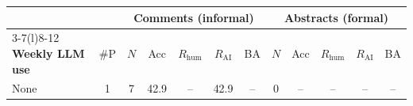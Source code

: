 \documentclass[thesis]{cluu}
\newcommand{\cg}[1]{\cellcolor{hmgreen!#1}}
\newcommand{\crd}[1]{\cellcolor{hmred!#1}}
\providecommand{\DIFaddbeginFL}{} %
\providecommand{\DIFaddendFL}{} %
\providecommand{\DIFdelbeginFL}{} %
\providecommand{\DIFdelendFL}{} %
\begin{document}
\begin{table}[H]
  \centering
  \small
  \DIFdelbeginFL %
\DIFdelendFL \DIFaddbeginFL \setlength{\tabcolsep}{3pt}
  \DIFaddendFL \renewcommand{\arraystretch}{1.15}
  \DIFdelbeginFL %
\DIFdelendFL \DIFaddbeginFL \begin{tabular}{l c c cccc c cccc}
    \toprule
    & & \multicolumn{5}{c}{\textbf{Comments} (informal)}
        & \multicolumn{5}{c}{\textbf{Abstracts} (formal)} \\
    \cmidrule(lr){3-7}\cmidrule(l){8-12}
    \textbf{Weekly LLM use} & \#P
     & $N$ & Acc & $R_{\mathrm{hum}}$ & $R_{\mathrm{AI}}$ & BA
     & $N$ & Acc & $R_{\mathrm{hum}}$ & $R_{\mathrm{AI}}$ & BA \\
    \midrule
None & 1 & 7 & 42.9 & -- & 42.9 & -- & 0 & -- & -- & -- & -- \\

\end{tabular}
\end{table}
\end{document}
